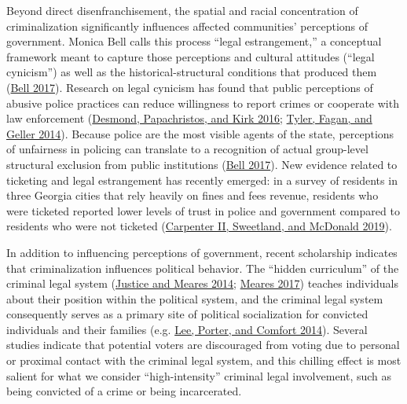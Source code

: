 \documentclass[
  12pt,
]{article}
\begin{document}
Beyond direct disenfranchisement, the spatial and racial concentration of criminalization significantly influences affected communities' perceptions of government. Monica Bell calls this process ``legal estrangement,'' a conceptual framework meant to capture those perceptions and cultural attitudes (``legal cynicism'') as well as the historical-structural conditions that produced them (\protect\hyperlink{ref-Bell2017}{Bell 2017}). Research on legal cynicism has found that public perceptions of abusive police practices can reduce willingness to report crimes or cooperate with law enforcement (\protect\hyperlink{ref-Desmond2016}{Desmond, Papachristos, and Kirk 2016}; \protect\hyperlink{ref-Tyler2014}{Tyler, Fagan, and Geller 2014}). Because police are the most visible agents of the state, perceptions of unfairness in policing can translate to a recognition of actual group-level structural exclusion from public institutions (\protect\hyperlink{ref-Bell2017}{Bell 2017}). New evidence related to ticketing and legal estrangement has recently emerged: in a survey of residents in three Georgia cities that rely heavily on fines and fees revenue, residents who were ticketed reported lower levels of trust in police and government compared to residents who were not ticketed (\protect\hyperlink{ref-CarpenterII2019}{Carpenter II, Sweetland, and McDonald 2019}).

In addition to influencing perceptions of government, recent scholarship indicates that criminalization influences political behavior. The ``hidden curriculum'' of the criminal legal system (\protect\hyperlink{ref-Justice2014}{Justice and Meares 2014}; \protect\hyperlink{ref-Meares2017}{Meares 2017}) teaches individuals about their position within the political system, and the criminal legal system consequently serves as a primary site of political socialization for convicted individuals and their families (e.g. \protect\hyperlink{ref-Lee2014}{Lee, Porter, and Comfort 2014}). Several studies indicate that potential voters are discouraged from voting due to personal or proximal contact with the criminal legal system, and this chilling effect is most salient for what we consider ``high-intensity'' criminal legal involvement, such as being convicted of a crime or being incarcerated.
\end{document}
